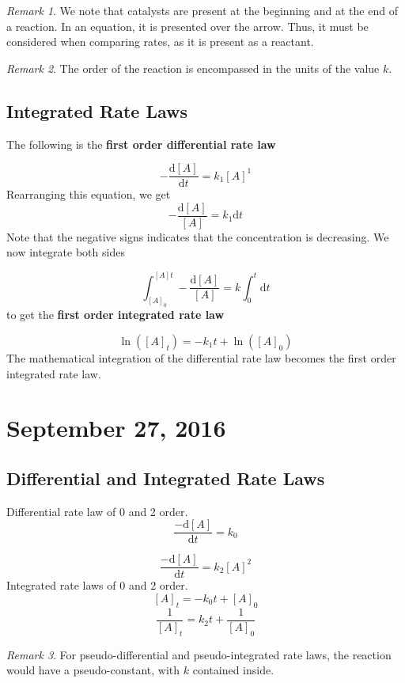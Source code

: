 \documentclass[11pt]{article}
\theoremstyle{plain} %
\theoremstyle{definition}
\theoremstyle{example}
\theoremstyle{remark}
\newtheorem*{remark}{Remark}
\begin{document}
\begin{remark}
We note that catalysts are present at the beginning and at the end of a reaction. In an equation, it is presented over the arrow. Thus, it must be considered when comparing rates, as it is present as a reactant. 
\end{remark}

\begin{remark}
The order of the reaction is encompassed in the units of the value $k$. 
\end{remark}

\subsection{Integrated Rate Laws}

The following is the \textbf{first order differential rate law}

$$-\frac{\mathrm d [A]}{\mathrm d t} = k_1[A]^1$$
Rearranging this equation, we get 
$$-\frac{\mathrm d [A]}{[A]} = k_1\mathrm d t$$
Note that the negative signs indicates that the concentration is decreasing. We now integrate both sides 

$$\int_{[A]_0}^{[A]t}-\frac{\mathrm d [A]}{[A]} = k\int_0^t\mathrm d t$$ to get the \textbf{first order integrated rate law}

$$\ln\left([A]_t \right)= -k_1t+\ln\left([A]_0\right)$$
The mathematical integration of the differential rate law becomes the first order integrated rate law. 




\section{September 27, 2016}
\subsection{Differential and Integrated Rate Laws}

Differential rate law of 0 and 2 order.
$$\frac{-\mathrm d [A]}{\mathrm d t} = k_0$$


$$\frac{-\mathrm d [A]}{\mathrm d t} = k_2[A]^2$$
Integrated rate laws of 0 and 2 order.
$$[A]_t = -k_0t + [A]_0$$
$$\frac{1}{[A]_t}=k_2t+\frac{1}{[A]_0}$$


\begin{remark}
For pseudo-differential and pseudo-integrated rate laws, the reaction would have a pseudo-constant, with $k$ contained inside.
\end{remark}
\end{document}

